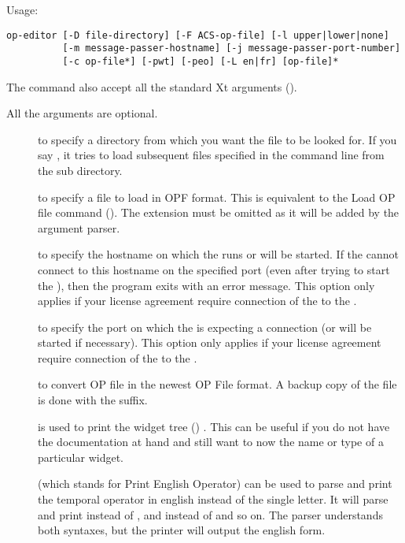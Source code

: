 Usage: \begin{verbatim}
op-editor [-D file-directory] [-F ACS-op-file] [-l upper|lower|none]
          [-m message-passer-hostname] [-j message-passer-port-number]
          [-c op-file*] [-pwt] [-peo] [-L en|fr] [op-file]*
\end{verbatim}

The  command also accept all the standard Xt arguments
(). 

All the arguments are optional.

\begin{description}

\item[] to specify a directory from which you want the file to
be looked for. If you say , it tries to load
subsequent files specified in the command line from the 
sub directory.

\item[] to specify a file to load in OPF format. This is
equivalent to the Load OP file command (). The
 extension must be omitted as it will be added by the
argument parser.

\item[] to specify the hostname on which the \MPA{} runs or will be
started. If the \OPE{} cannot connect to this hostname on the specified port
(even after trying to start the \MPA{}), then the program exits with an error
message. This option only applies if your license agreement require connection
of the \OPE{} to the \MPA{}.

\item[] to specify the port on which the \MPA{} is expecting a
connection (or will be started if necessary). This option only applies if your
license agreement require connection of the \OPE{} to the \MPA{}.

\item[] to convert OP file in the newest OP File format. A backup copy
of the file is done with the  suffix.

\item[] is used to print the \OPE{} widget tree () . This can be useful if you do not have the
documentation at hand and still want to now the name or type of a particular
widget.

\item[] (which stands for Print English Operator) can be used to
parse and print the temporal operator in english instead of the single letter. It will
parse and print  instead of \samp{!}, and  instead of \samp{\^{}}
and so on. The parser understands both syntaxes, but the printer will output the english form.


\end{description}
